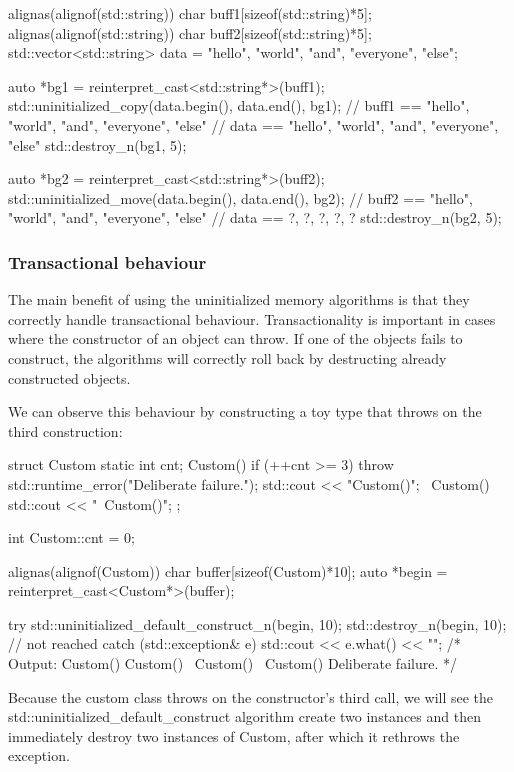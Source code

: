 \begin{box-note}
\begin{cppcode}
alignas(alignof(std::string)) char buff1[sizeof(std::string)*5];
alignas(alignof(std::string)) char buff2[sizeof(std::string)*5];
std::vector<std::string> data = {"hello", "world", "and", "everyone", "else"};

auto *bg1 = reinterpret_cast<std::string*>(buff1);
std::uninitialized_copy(data.begin(), data.end(), bg1);
// buff1 == { "hello", "world", "and", "everyone", "else"}
// data == { "hello", "world", "and", "everyone", "else"}
std::destroy_n(bg1, 5);

auto *bg2 = reinterpret_cast<std::string*>(buff2);
std::uninitialized_move(data.begin(), data.end(), bg2); 
// buff2 == { "hello", "world", "and", "everyone", "else"}
// data == { ?, ?, ?, ?, ?}
std::destroy_n(bg2, 5);
\end{cppcode}
\end{box-note}

\subsubsection{Transactional behaviour}

The main benefit of using the uninitialized memory algorithms is that they correctly handle transactional behaviour. Transactionality is important in cases where the constructor of an object can throw. If one of the objects fails to construct, the algorithms will correctly roll back by destructing already constructed objects.

We can observe this behaviour by constructing a toy type that throws on the third construction:

\begin{box-note}
\begin{cppcode}
struct Custom {
  static int cnt;
  Custom() { 
    if (++cnt >= 3)
      throw std::runtime_error("Deliberate failure."); 
    std::cout << "Custom()\n";
  }
  ~Custom() {
    std::cout << "~Custom()\n";
  }
};

int Custom::cnt = 0;

alignas(alignof(Custom)) char buffer[sizeof(Custom)*10];
auto *begin = reinterpret_cast<Custom*>(buffer);

try {
  std::uninitialized_default_construct_n(begin, 10);
  std::destroy_n(begin, 10); // not reached
} catch (std::exception& e) {
  std::cout << e.what() << "\n";
}
/* Output:
Custom()
Custom()
~Custom()
~Custom()
Deliberate failure.
*/
\end{cppcode}
\end{box-note}

Because the custom class throws on the constructor’s third call, we will see the std::uninitialized\_default\_construct algorithm create two instances and then immediately destroy two instances of Custom, after which it rethrows the exception.
